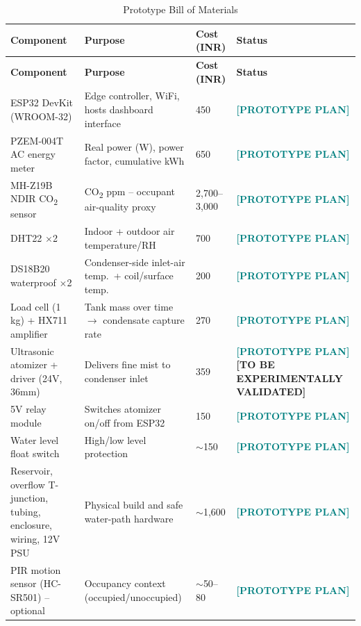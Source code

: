 \documentclass[11pt,a4paper]{article}
\newcommand{\prototype}{\textcolor{teal}{\textbf{[PROTOTYPE PLAN]}}}
\newcommand{\tobevalidated}{\textcolor{red!70!black}{\textbf{[TO BE EXPERIMENTALLY VALIDATED]}}}
\begin{document}
\begin{longtable}{p{4.3cm}p{5.3cm}p{1.6cm}p{2.3cm}}
\caption{Prototype Bill of Materials} \\
\toprule
\textbf{Component} & \textbf{Purpose} & \textbf{Cost (INR)} & \textbf{Status} \\
\midrule
\endfirsthead
\toprule
\textbf{Component} & \textbf{Purpose} & \textbf{Cost (INR)} & \textbf{Status} \\
\midrule
\endhead
ESP32 DevKit (WROOM-32) & Edge controller, WiFi, hosts dashboard interface & 450 & \prototype \\
PZEM-004T AC energy meter & Real power (W), power factor, cumulative kWh & 650 & \prototype \\
MH-Z19B NDIR CO\textsubscript{2} sensor & CO\textsubscript{2} ppm -- occupant air-quality proxy & 2{,}700--3{,}000 & \prototype \\
DHT22 $\times$2 & Indoor + outdoor air temperature/RH & 700 & \prototype \\
DS18B20 waterproof $\times$2 & Condenser-side inlet-air temp.\ + coil/surface temp.\ & 200 & \prototype \\
Load cell (1\,kg) + HX711 amplifier & Tank mass over time $\rightarrow$ condensate capture rate & 270 & \prototype \\
Ultrasonic atomizer + driver (24V, 36mm) & Delivers fine mist to condenser inlet & 359 & \prototype \tobevalidated \\
5V relay module & Switches atomizer on/off from ESP32 & 150 & \prototype \\
Water level float switch & High/low level protection & $\sim$150 & \prototype \\
Reservoir, overflow T-junction, tubing, enclosure, wiring, 12V PSU & Physical build and safe water-path hardware & $\sim$1{,}600 & \prototype \\
PIR motion sensor (HC-SR501) -- optional & Occupancy context (occupied/unoccupied) & $\sim$50--80 & \prototype \\
\bottomrule
\end{longtable}
\end{document}
